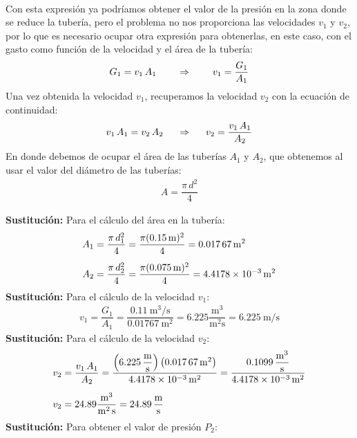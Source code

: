 \documentclass[14pt]{extarticle}
\begin{document}
\begin{enumerate}
\begin{align*}
\end{align*}
Con esta expresión ya podríamos obtener el valor de la presión en la zona donde se reduce la tubería, pero el problema no nos proporciona las velocidades $v_{1}$ y $v_{2}$, por lo que es necesario ocupar otra expresión para obtenerlas, en este caso, con el gasto como función de la velocidad y el área de la tubería:
\begin{align*}
G_{1} = v_{1} \, A_{1} \hspace*{0.75cm} \Rightarrow \hspace{0.75cm} v_{1} = \dfrac{G_{1}}{A_{1}}
\end{align*}
Una vez obtenida la velocidad $v_{1}$, recuperamos la velocidad $v_{2}$ con la ecuación de continuidad:
\begin{align*}
v_{1} \, A_{1} = v_{2} \, A_{2} \hspace*{0.5cm} \Rightarrow \hspace{0.5cm} v_{2} = \dfrac{v_{1} \, A_{1}}{A_{2}}
\end{align*}
En donde debemos de ocupar el área de las tuberías $A_{1}$ y $A_{2}$, que obtenemos al usar el valor del diámetro de las tuberías:
\begin{align*}
A = \dfrac{\pi \, d^{2}}{4}
\end{align*}

\textbf{Sustitución: } Para el cálculo del área en la tubería:
\begin{align*}
A_{1} &= \dfrac{\pi \, d_{1}^{2}}{4} = \dfrac{\pi (\SI{0.15}{\meter})^{2}}{4} = \SI{0.01767}{\square\meter} \\[0.5em]
A_{2} &= \dfrac{\pi \, d_{2}^{2}}{4} = \dfrac{\pi (\SI{0.075}{\meter})^{2}}{4} = \SI{4.4178d-3}{\square\meter}
\end{align*}
\textbf{Sustitución: } Para el cálculo de la velocidad $v_{1}$:
\begin{align*}
v_{1} = \dfrac{G_{1}}{A_{1}} = \dfrac{\displaystyle \SI[per-mode=fraction]{0.11}{\cubic\meter\per\second}}{\SI{0.01767}{\square\meter}} = \num{6.225} \dfrac{\unit{\cubic\meter}}{\unit{\square\meter\second}} = \SI[per-mode=fraction]{6.225}{\meter\per\second}
\end{align*}
\textbf{Sustitución: } Para el cálculo de la velocidad $v_{2}$:
\begin{align*}
v_{2} &= \dfrac{v_{1} \, A_{1}}{A_{2}} = \dfrac{\left( \displaystyle \SI[per-mode=fraction]{6.225}{\meter\per\second} \right) \left( \SI{0.01767}{\square\meter} \right)}{\SI{4.4178d-3}{\square\meter}} = \dfrac{\displaystyle \SI[per-mode=fraction]{0.1099}{\cubic\meter\per\second}}{\SI{4.4178d-3}{\square\meter}} \\[0.5em]
v_{2} &= \num{24.89} \dfrac{\unit{\cubic\meter}}{\unit{\square\meter\second}} = \SI[per-mode=fraction]{24.89}{\meter\per\second}
\end{align*}
\textbf{Sustitución: } Para obtener el valor de presión $P_{2}$:


\end{enumerate}
\end{document}
